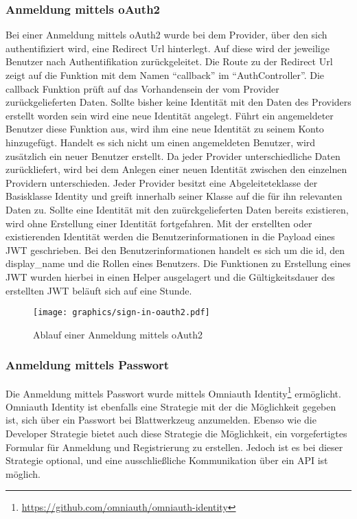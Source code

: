 \subsubsection{Anmeldung mittels \gls{oAuth2}}
\label{sec:sever-sign-in-oauth2}
Bei einer Anmeldung mittels \gls{oAuth2} wurde bei dem Provider, über den sich authentifiziert wird, eine Redirect Url hinterlegt. Auf diese wird der jeweilige Benutzer nach Authentifikation zurückgeleitet. Die Route zu der Redirect Url zeigt auf die Funktion mit dem Namen \enquote{callback} im \enquote{AuthController}. Die callback Funktion prüft auf das Vorhandensein der vom Provider zurückgelieferten Daten. Sollte bisher keine Identität mit den Daten des Providers erstellt worden sein wird eine neue Identität angelegt. Führt ein angemeldeter Benutzer diese Funktion aus, wird ihm eine neue Identität zu seinem Konto hinzugefügt. Handelt es sich nicht um einen angemeldeten Benutzer, wird zusätzlich ein neuer Benutzer erstellt. Da jeder Provider unterschiedliche Daten zurückliefert, wird bei dem Anlegen einer neuen Identität zwischen den einzelnen Providern unterschieden. Jeder Provider besitzt eine Abgeleiteteklasse der Basisklasse Identity und greift innerhalb seiner Klasse auf die für ihn relevanten Daten zu. Sollte eine Identität mit den zuürckgelieferten Daten bereits existieren, wird ohne Erstellung einer Identität fortgefahren. Mit der erstellten oder existierenden Identität werden die Benutzerinformationen in die Payload eines \gls{JWT} geschrieben. Bei den Benutzerinformationen handelt es sich um die id, den display\_name und die Rollen eines Benutzers. Die Funktionen zu Erstellung eines \gls{JWT} wurden hierbei in einen Helper ausgelagert und die Gültigkeitsdauer des erstellten \gls{JWT} beläuft sich auf eine Stunde.

\begin{figure}[h]
	\centering
	\texttt{[image: graphics/sign-in-oauth2.pdf]}
	\caption{Ablauf einer Anmeldung mittels \gls{oAuth2}}
	\label{fig:server-sign-in-oauth}
\end{figure}

\subsubsection{Anmeldung mittels Passwort}
\label{sec:sever-sign-in-password}
Die Anmeldung mittels Passwort wurde mittels Omniauth Identity\footnote{\url{https://github.com/omniauth/omniauth-identity}} ermöglicht. Omniauth Identity ist ebenfalls eine Strategie mit der die Möglichkeit gegeben ist, sich über ein Passwort bei Blattwerkzeug anzumelden. Ebenso wie die Developer Strategie bietet auch diese Strategie die Möglichkeit, ein vorgefertigtes Formular für Anmeldung und Registrierung zu erstellen. Jedoch ist es bei dieser Strategie optional, und eine ausschlie{\ss}liche Kommunikation über ein API ist möglich.

